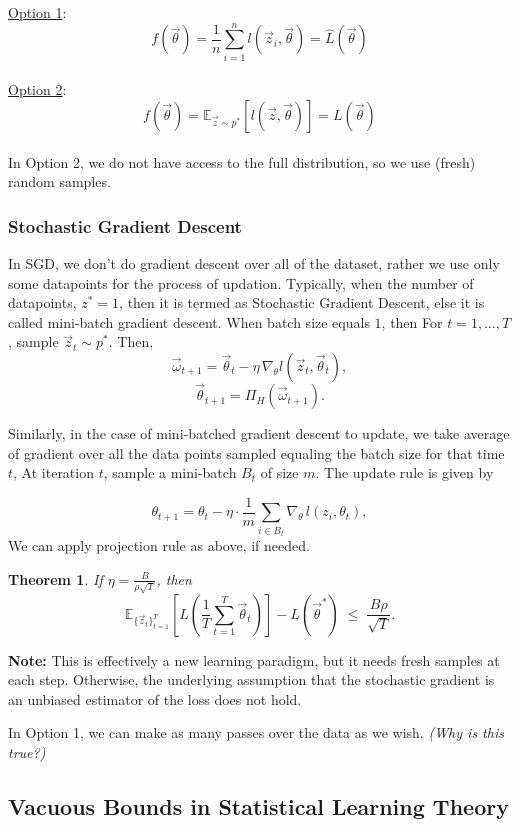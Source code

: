 \documentclass[11pt]{article}
\theoremstyle{plain}
\newtheorem{theorem}{Theorem}
\begin{document}
\underline{Option 1}:
\[
f(\vec{\theta}) = \frac{1}{n} \sum_{i=1}^{n} l(\vec{z}_i, \vec{\theta}) = \hat{L}(\vec{\theta})
\]
\\
\underline{Option 2}:
\[
f(\vec{\theta}) = \mathbb{E}_{\vec{z} \sim p^*} \left[ l(\vec{z}, \vec{\theta}) \right] = L(\vec{\theta})
\]\\

In Option 2, we do not have access to the full distribution, so we use (fresh) random samples.

\subsubsection{Stochastic Gradient Descent}
In SGD, we don't do gradient descent over all of the dataset, rather we use only
some datapoints for the process of updation. Typically, when the number of datapoints, $z^* =1$, then it is termed as Stochastic Gradient Descent, else it is called mini-batch gradient descent. When batch size equals $1$, then  For $t = 1, \dots, T$, sample $\vec{z}_t \sim p^*$.  
Then,
\[
\vec{\omega}_{t+1} = \vec{\theta}_t - \eta \, \nabla_\theta l(\vec{z}_t, \vec{\theta}_t),
\]
\[
\vec{\theta}_{t+1} = \Pi_H(\vec{\omega}_{t+1}).
\]

Similarly, in the case of mini-batched gradient descent to update, we take average of gradient over all the data points sampled equaling the batch size for that time $t$,
At iteration $t$, sample a mini-batch $B_t$ of size $m$.  
The update rule is given by

\[
\theta_{t+1} 
= \theta_t - \eta \cdot \frac{1}{m} \sum_{i \in B_t} \nabla_\theta \, l(z_i, \theta_t),
\]
We can apply projection rule as above, if needed.
\begin{theorem}
If $\eta = \frac{B}{\rho \sqrt{T}}$, then
\[
\mathbb{E}_{\{\vec{z}_t\}_{t=1}^T} \left[ L\!\left( \frac{1}{T} \sum_{t=1}^T \vec{\theta}_t \right) \right]
- L(\vec{\theta}^*)
\;\le\; \frac{B\rho}{\sqrt{T}}.
\]
\end{theorem}

\noindent\textbf{Note:} This is effectively a new learning paradigm, but it needs fresh samples at each step.  
Otherwise, the underlying assumption that the stochastic gradient is an unbiased estimator of the loss does not hold.

\medskip
\noindent 
In Option 1, we can make as many passes over the data as we wish. \textit{(Why is this true?)} 

\subsection{Vacuous Bounds in Statistical Learning Theory}
\end{document}
